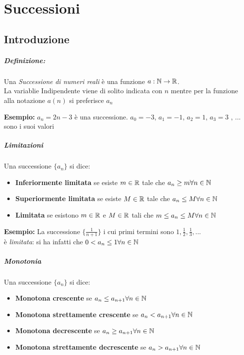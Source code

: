 \documentclass[12pt, a4paper, openany]{book}
\newcommand{\esempio}[1]{\begin{box_esempio} \textbf{Esempio: }#1\end{box_esempio}}
\begin{document}
\chapter{Successioni}
\section{Introduzione}
\paragraph{Definizione: }Una \emph{Successione di numeri reali} è una funzione $a: \mathbb{N} \to \mathbb{R}$.\\
La variablie Indipendente viene di solito indicata con $n$ mentre per la funzione alla notazione $a(n)$ si preferisce $a_n$

\esempio{
    $a_n = 2n-3$ è una successione.
    $a_0 = -3$, $a_1 = -1$, $a_2 = 1$, $a_3 = 3$ , ... sono i suoi valori
}
\paragraph*{Limitazioni} Una successione $\{a_n\}$ si dice:
\begin{itemize}
    \item \textbf{Inferiormente limitata} se esiste $m \in \mathbb{R}$ tale che $a_n \geq m \forall n \in \mathbb{N}$
    \item \textbf{Superiormente limitata} se esiste $M \in \mathbb{R}$ tale che $a_n \leq M \forall n \in \mathbb{N}$
    \item \textbf{Limitata} se esistono $m \in \mathbb{R}$ e $M \in \mathbb{R}$ tali che $m \leq a_n \leq M \forall n \in \mathbb{N}$
\end{itemize}
\esempio{
    La successione $\{\frac{1}{n+1}\}$ i cui primi termini sono $1, \frac{1}{2}, \frac{1}{3},$...\\
    è \emph{limitata}: si ha infatti che $0 < a_n \leq 1 \forall n \in \mathbb{N}$
}

\paragraph*{Monotonia} Una successione $\{a_n\}$ si dice:
\begin{itemize}
    \item \textbf{Monotona crescente} se $a_n\leq a_{n+1} \forall n \in \mathbb{N}$
    \item \textbf{Monotona strettamente crescente} se $a_n < a_{n+1} \forall n \in \mathbb{N}$
    \item \textbf{Monotona decrescente} se $a_n \geq a_{n+1} \forall n\in\mathbb{N}$
    \item \textbf{Monotona strettamente decrescente} se $a_n > a_{n+1} \forall n \in \mathbb{N}$
\end{itemize}
\end{document}
